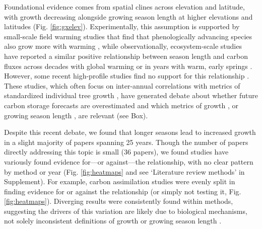 \documentclass[11pt]{article}
\begin{document}
Foundational evidence comes from spatial clines across elevation and latitude, with growth decreasing alongside growing season length at higher elevations and latitudes (Fig. \ref{fig:gxelev}). Experimentally, this assumption is supported by small-scale field warming studies that find that phenologically advancing species also grow more with warming \citep[][]{Cleland:2012}, while observationally, ecosystem-scale studies have reported a similar positive relationship between season length and carbon fluxes across decades with global warming \citep{keenan2014net} or in years with warm, early springs \citep{chen1999effects}. However, some recent high-profile studies find no support for this relationship \citep{dow2022warm}. These studies, which often focus on inter-annual correlations with metrics of standardized individual tree growth \citep{dow2022warm,silvestro2023longer}, have generated debate about whether future carbon storage forecasts are overestimated and which metrics of growth \citep{green2022limits}, or growing season length \citep{korner2023four}, are relevant (see Box).

Despite this recent debate, we found that longer seasons lead to increased growth in a slight majority of papers spanning  25 years. Though the number of papers directly addressing this topic is small (36 papers), we found studies have variously found evidence for---or against---the relationship, with no clear pattern by method or year (Fig. \ref{fig:heatmaps} and see `Literature review methods' in Supplement). For example, carbon assimilation studies were evenly split in finding evidence for or against the relationship  (or simply not testing it, Fig. \ref{fig:heatmaps}). Diverging results were consistently found within methods, suggesting the drivers of this variation are likely due to biological mechanisms, not solely inconsistent definitions of growth or growing season length \citep[as some have recently suggested, e.g.][and see Box]{green2022limits,korner2023four}. 
\end{document}
